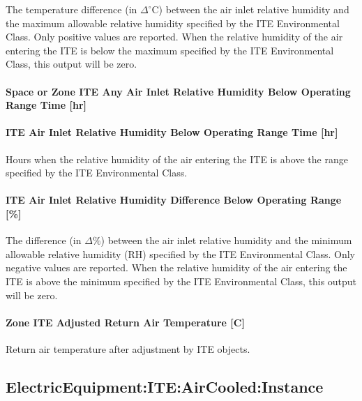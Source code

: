 The temperature difference (in $\Delta^{\circ}$C) between the air inlet relative humidity and the maximum allowable relative humidity specified by the ITE Environmental Class. Only positive values are reported. When the relative humidity of the air entering the ITE is below the maximum specified by the ITE Environmental Class, this output will be zero.

\paragraph{Space or Zone ITE Any Air Inlet Relative Humidity Below Operating Range Time {[}hr{]}}\label{zone-ite-any-air-inlet-relative-humidity-below-operating-range-time-hr}

\paragraph{ITE Air Inlet Relative Humidity Below Operating Range Time {[}hr{]}}\label{ite-air-inlet-relative-humidity-below-operating-range-time-hr}

Hours when the relative humidity of the air entering the ITE is above the range specified by the ITE Environmental Class.

\paragraph{ITE Air Inlet Relative Humidity Difference Below Operating Range {[}\%{]}}\label{ite-air-inlet-relative-humidity-difference-below-operating-range}

The difference (in $\Delta\%$) between the air inlet relative humidity and the minimum allowable relative humidity (RH) specified by the ITE Environmental Class. Only negative values are reported. When the relative humidity of the air entering the ITE is above the minimum specified by the ITE Environmental Class, this output will be zero.

\paragraph{Zone ITE Adjusted Return Air Temperature [C]}

Return air temperature after adjustment by ITE objects.


\subsection{ElectricEquipment:ITE:AirCooled:Instance}\label{electricequipmentiteaircooledinstance}

